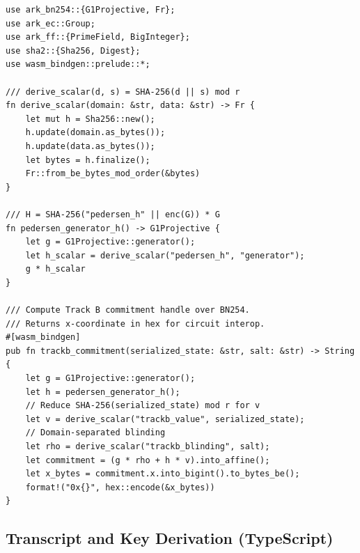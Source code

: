 \documentclass[11pt]{article}
\begin{document}
\begin{verbatim}
use ark_bn254::{G1Projective, Fr};
use ark_ec::Group;
use ark_ff::{PrimeField, BigInteger};
use sha2::{Sha256, Digest};
use wasm_bindgen::prelude::*;

/// derive_scalar(d, s) = SHA-256(d || s) mod r
fn derive_scalar(domain: &str, data: &str) -> Fr {
    let mut h = Sha256::new();
    h.update(domain.as_bytes());
    h.update(data.as_bytes());
    let bytes = h.finalize();
    Fr::from_be_bytes_mod_order(&bytes)
}

/// H = SHA-256("pedersen_h" || enc(G)) * G
fn pedersen_generator_h() -> G1Projective {
    let g = G1Projective::generator();
    let h_scalar = derive_scalar("pedersen_h", "generator");
    g * h_scalar
}

/// Compute Track B commitment handle over BN254.
/// Returns x-coordinate in hex for circuit interop.
#[wasm_bindgen]
pub fn trackb_commitment(serialized_state: &str, salt: &str) -> String {
    let g = G1Projective::generator();
    let h = pedersen_generator_h();
    // Reduce SHA-256(serialized_state) mod r for v
    let v = derive_scalar("trackb_value", serialized_state);
    // Domain-separated blinding
    let rho = derive_scalar("trackb_blinding", salt);
    let commitment = (g * rho + h * v).into_affine();
    let x_bytes = commitment.x.into_bigint().to_bytes_be();
    format!("0x{}", hex::encode(&x_bytes))
}
\end{verbatim}

\subsection{Transcript and Key Derivation (TypeScript)}
\end{document}
